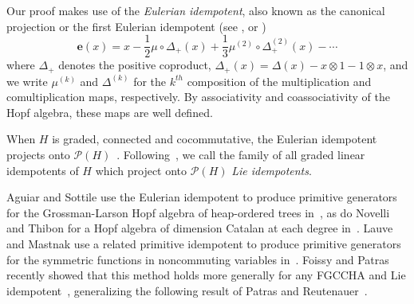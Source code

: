 \documentclass[11pt]{amsart}
\theoremstyle{definition}
\numberwithin{equation}{section}
\newcommand{\FGCCHA}{\textsf{FGCCHA}\xspace}
\newcommand{\lucas}[1]{\todo[size=\tiny,color=red!50]{#1 \\ \hfill --- Lucas}}
\begin{document}
Our proof makes use of the \emph{Eulerian idempotent}, also known as the canonical projection or the first Eulerian idempotent (see \cite{P94}, \cite[\S 1.4]{AS05cc} or \cite[\S 4.5.2]{loday2013cyclic})
\begin{equation}
\label{eq:eulerianidempotent}
\mathbf{e}(x) = x - \frac{1}{2}\mu \circ \Delta_{+}(x) + \frac{1}{3} \mu^{(2)} \circ \Delta_{+}^{(2)}(x) - \cdots 
\end{equation}
where $\Delta_{+}$ denotes the positive coproduct, $\Delta_{+}(x) = \Delta(x) - x \otimes 1 - 1 \otimes x$,
and we write $\mu^{(k)}$ and $\Delta^{(k)}$ for the $k^{th}$
composition of the multiplication and comultiplication maps, respectively.
By associativity and coassociativity of the Hopf algebra, these maps are well defined.

When $H$ is graded, connected and cocommutative, the Eulerian idempotent projects onto $\mathcal{P}(H)$~\cite[Theorem 9.4]{S94}.
Following~\cite{P99}, we call the family of all graded linear idempotents of $H$ which project onto $\mathcal{P}(H)$ \emph{Lie idempotents}.

Aguiar and Sottile use the Eulerian idempotent to produce primitive generators for the Grossman-Larson
Hopf algebra of heap-ordered trees in~\cite{AS05cc},
as do Novelli and Thibon for a Hopf algebra of dimension Catalan at each degree in~\cite[\S 5]{NT05}.
Lauve and Mastnak use a related primitive idempotent to produce primitive generators for
the symmetric functions in noncommuting variables in~\cite{LM11}.  
Foissy and Patras recently showed that this method holds more generally for any \FGCCHA and Lie idempotent~\cite{FP24}, 
generalizing the following result of Patras and Reutenauer~\cite{PR04}.
\end{document}
